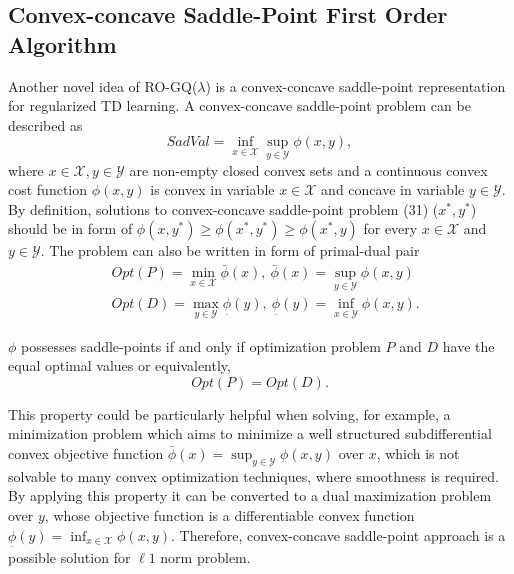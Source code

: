 \documentclass[conference]{IEEEtran}
\begin{document}
\subsection{Convex-concave Saddle-Point First Order Algorithm}
Another novel idea of RO-GQ($\lambda$) is a convex-concave saddle-point representation for regularized TD learning. A convex-concave saddle-point problem can be described as \cite{sra2012optimization}
\begin{equation}
	SadVal=\inf_{x\in\mathcal{X}}\sup_{y\in\mathcal{{Y}}}\phi(x,y),
\end{equation}
where $x\in\mathcal{X}, y\in\mathcal{Y}$ are non-empty closed convex sets and a continuous convex cost function $\phi(x, y)$ is convex in variable $x\in\mathcal{X}$ and concave in variable $y\in\mathcal{Y}$. By definition, solutions to convex-concave saddle-point problem (31) ($x^*,y^*$) should be in form of $\phi(x, y^*)\geq\phi(x^*, y^*)\geq\phi(x^*, y)$ for every $x\in\mathcal{X}$ and $y\in\mathcal{Y}$. The problem can also be written in form of primal-dual pair 
\begin{equation}
  \begin{split}
    &Opt(P)=\min_{x\in\mathcal{X}}\bar{\phi}(x),\ \bar{\phi}(x)=\sup_{y\in\mathcal{Y}}\phi(x, y)\\
    &Opt(D)=\max_{y\in\mathcal{Y}}\underset{\bar{}}{\phi}(y),\ \underset{\bar{}}{\phi}(y)=\inf_{x\in\mathcal{Y}}\phi(x, y).
  \end{split}
\end{equation}

$\phi$ possesses saddle-points if and only if optimization problem $P$ and $D$ have the equal optimal values or equivalently,
\begin{equation}
  Opt(P) = Opt(D).
\end{equation}

This property could be particularly helpful when solving, for example, a minimization problem which aims to minimize a well structured subdifferential convex objective function $\bar{\phi}(x) = \sup_{y\in\mathcal{Y}}\phi(x, y)$ over $x$, which is not solvable to many convex optimization techniques, where smoothness is required. By applying this property it can be converted to a dual maximization problem over $y$, whose objective function is a differentiable convex function $\underset{\bar{}}{\phi}(y)=\inf_{x\in\mathcal{X}}\phi(x, y)$. Therefore, convex-concave saddle-point approach is a possible solution for $\ell1$ norm problem.
\end{document}
